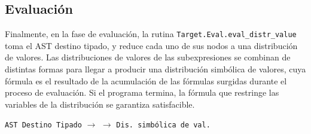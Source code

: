 \subsection{Evaluación}
Finalmente, en la fase de evaluación, la rutina
\verb|Target.Eval.eval_distr_value| toma el AST destino tipado, y
reduce cada uno de sus nodos a una distribución de valores. Las
distribuciones de valores de las subexpresiones se combinan de
distintas formas para llegar a producir una distribución simbólica de
valores, cuya fórmula es el resultado de la acumulación de las
fórmulas surgidas durante el proceso de evaluación. Si el programa
termina, la fórmula que restringe las variables de la distribución se
garantiza satisfacible.
\begin{center}
  \texttt{AST Destino Tipado}
  $\rightarrow$
  $\rightarrow$
  \texttt{Dis. simbólica de val.}
\end{center}


